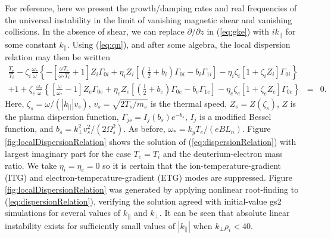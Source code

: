 \documentclass[12pt,superscriptaddress]{revtex4}
\newcommand{\omegase}{\omega_{*}}
\begin{document}
For reference, here we present the growth/damping rates and real frequencies of the
universal instability in the limit of vanishing
magnetic shear and vanishing collisions.
In the absence of shear, we can replace $\partial/\partial z$ in (\ref{eq:gke})
with $i k_{||}$ for some constant $k_{||}$.
Using (\ref{eq:qn}), and after some algebra, the local dispersion relation may then be written
\begin{eqnarray}
\frac{T_e}{T_i}-\zeta_i\frac{\omegase}{\omega}\left\{
-\left[\frac{\omega T_e}{\omegase T_i}+1\right]Z_i \Gamma_{0i}
+\eta_i Z_i \left[ \left(\frac{1}{2}+b_i\right) \Gamma_{0i}-b_i \Gamma_{1i}\right]
-\eta_i \zeta_i \left[1+\zeta_i Z_i\right] \Gamma_{0i}\right\}
&&\label{eq:dispersionRelation} \\
+
1+\zeta_e\frac{\omegase}{\omega}\left\{
\left[\frac{\omega}{\omegase}-1\right]Z_e \Gamma_{0e}
+\eta_e Z_e \left[ \left(\frac{1}{2}+b_e\right) \Gamma_{0e}-b_e \Gamma_{1e}\right]
-\eta_e \zeta_e \left[1+\zeta_e Z_e\right] \Gamma_{0e}\right\}
&=&0.
\nonumber
\end{eqnarray}
Here, $\zeta_s = \omega/(\left| k_{||} \right| v_s)$, $v_s = \sqrt{2 T_s/m_s}$ is the thermal speed, $Z_s = Z(\zeta_s)$, $Z$ is the plasma dispersion function,
$\Gamma_{js} = I_j(b_s)e^{-b_s}$, $I_j$ is a modified Bessel function, and $b_s = k_{\perp}^2 v_s^2/(2 \Omega_s^2)$.
As before, $\omega_* = k_y T_e/(e B L_n)$.
Figure \ref{fig:localDispersionRelation} shows the solution of (\ref{eq:dispersionRelation})
with largest imaginary part for the case $T_e = T_i$
and the deuterium-electron mass ratio.
We take $\eta_i = \eta_e = 0$
so it is certain that the ion-temperature-gradient (ITG) and electron-temperature-gradient (ETG)
modes are suppressed.
Figure \ref{fig:localDispersionRelation} was generated by applying nonlinear root-finding to (\ref{eq:dispersionRelation}),
verifying the solution agreed with initial-value gs2 simulations for several values of $k_{||}$ and $k_{\perp}$.
It can be seen that absolute linear instability exists for sufficiently small values of $\left|k_{||}\right|$
when $k_{\perp} \rho_i < 40$.
\end{document}
